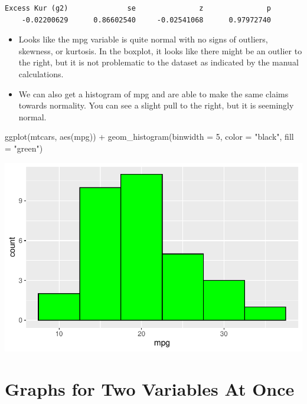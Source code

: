 \documentclass[
  letterpaper,
  DIV=11,
  numbers=noendperiod]{scrreprt}
\newenvironment{Shaded}{\begin{snugshade}}{\end{snugshade}}
\newcommand{\AttributeTok}[1]{\textcolor[rgb]{0.40,0.45,0.13}{#1}}
\newcommand{\DecValTok}[1]{\textcolor[rgb]{0.68,0.00,0.00}{#1}}
\newcommand{\FunctionTok}[1]{\textcolor[rgb]{0.28,0.35,0.67}{#1}}
\newcommand{\NormalTok}[1]{\textcolor[rgb]{0.00,0.23,0.31}{#1}}
\newcommand{\SpecialCharTok}[1]{\textcolor[rgb]{0.37,0.37,0.37}{#1}}
\newcommand{\StringTok}[1]{\textcolor[rgb]{0.13,0.47,0.30}{#1}}
\begin{document}
\begin{verbatim}
Excess Kur (g2)              se               z               p 
    -0.02200629      0.86602540     -0.02541068      0.97972740 
\end{verbatim}

\begin{itemize}
\item
  Looks like the mpg variable is quite normal with no signs of outliers,
  skewness, or kurtosis. In the boxplot, it looks like there might be an
  outlier to the right, but it is not problematic to the dataset as
  indicated by the manual calculations.
\item
  We can also get a histogram of mpg and are able to make the same
  claims towards normality. You can see a slight pull to the right, but
  it is seemingly normal.
\end{itemize}

\begin{Shaded}
\begin{Highlighting}[]
\FunctionTok{ggplot}\NormalTok{(mtcars, }\FunctionTok{aes}\NormalTok{(mpg)) }\SpecialCharTok{+} \FunctionTok{geom\_histogram}\NormalTok{(}\AttributeTok{binwidth =} \DecValTok{5}\NormalTok{, }\AttributeTok{color =} \StringTok{"black"}\NormalTok{,}
    \AttributeTok{fill =} \StringTok{"green"}\NormalTok{)}
\end{Highlighting}
\end{Shaded}

\includegraphics{dataviz_files/figure-pdf/unnamed-chunk-34-1.pdf}


\chapter{Graphs for Two Variables At
Once}\label{graphs-for-two-variables-at-once}
\end{document}
